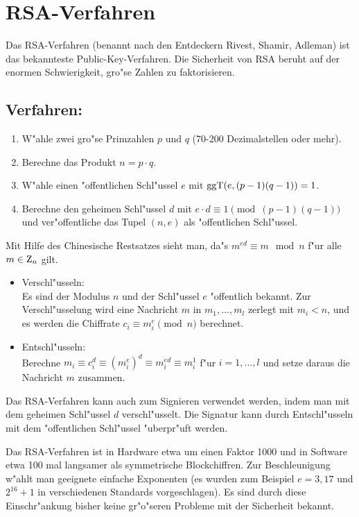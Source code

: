   \section{RSA-Verfahren}
     Das RSA-Verfahren (benannt nach den Entdeckern Rivest, Shamir, Adleman) ist
     das bekannteste Public-Key-Verfahren. Die Sicherheit von RSA beruht auf der 
     enormen Schwierigkeit, gro"se Zahlen zu faktorisieren. 
     \subsection*{Verfahren:}
     \begin{enumerate}
       \item W"ahle zwei gro"se Primzahlen $p$ und $q$ (70-200 Dezimalstellen oder mehr).
       \item Berechne das Produkt $n = p\cdot q$.
       \item W"ahle einen "offentlichen Schl"ussel $e$ mit $\mbox{ggT}(e,(p-1)(q-1))=1$.
       \item Berechne den geheimen Schl"ussel $d$ mit 
         $e\cdot d \equiv 1 \pmod{(p-1)(q-1)}$ und 
         ver"offentliche das Tupel $(n,e)$ als 
         "offentlichen Schl"ussel.
     \end{enumerate}
     Mit Hilfe des Chinesische Restsatzes sieht man, da"s 
     $m^{ed} \equiv m \mod{n}$ f"ur alle $m\in\Z_n$ gilt.
     \begin{itemize}
       \item Verschl"usseln: \\
         Es sind der Modulus $n$ und der Schl"ussel $e$ "offentlich bekannt. 
         Zur Verschl"usselung wird eine Nachricht $m$ in $m_1,\ldots ,m_l$ 
         zerlegt mit $m_i < n$, und es werden die 
         Chiffrate $c_i \equiv m_i^e \pmod{n}$ berechnet.
       \item Entschl"usseln: \\
         Berechne $m_i \equiv c_i^d \equiv (m_i^e)^d \equiv m_i^{ed} \equiv m_i^1$ 
         f"ur $i=1,\ldots,l$ und setze daraus die Nachricht $m$ zusammen.
     \end{itemize}
     Das RSA-Verfahren kann auch zum Signieren verwendet werden, 
     indem man mit dem geheimen Schl"ussel $d$ verschl"usselt.
     Die Signatur kann durch Entschl"usseln mit dem "offentlichen
     Schl"ussel "uberpr"uft werden.

     Das RSA-Verfahren ist in Hardware etwa um einen Faktor 1000 und in 
     Software etwa 100 mal langsamer als symmetrische Blockchiffren. 
     Zur Beschleunigung w"ahlt man 
     geeignete einfache Exponenten (es wurden zum Beispiel $e=3, 17$ und 
     $2^{16}+1$ in verschiedenen Standards vorgeschlagen). 
     Es sind durch diese Einschr"ankung bisher keine gr"o"seren Probleme 
     mit der Sicherheit bekannt.
